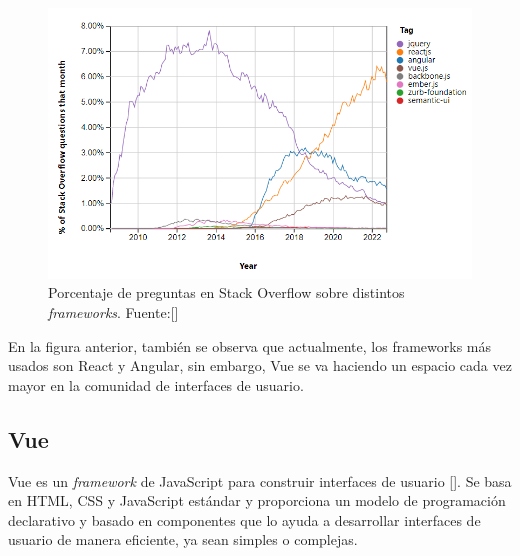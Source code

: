 \begin{figure}[htp]
\centering
\includegraphics[scale=0.9]{Graphics/stackoverflow}
\caption{Porcentaje de preguntas en Stack Overflow sobre distintos \textit{frameworks}. Fuente:[\cite{50}]}
\label{fig:stackoverflow}
\end{figure}

En la figura anterior, también se observa que actualmente, los frameworks más usados son React y Angular, sin embargo, Vue se va haciendo un espacio cada vez mayor en la comunidad de interfaces de usuario.


\subsection{Vue}
Vue es un \textit{framework} de JavaScript para construir interfaces de usuario [\cite{47}]. Se basa en HTML, CSS y JavaScript estándar y proporciona un modelo de programación declarativo y basado en componentes que lo ayuda a desarrollar interfaces de usuario de manera eficiente, ya sean simples o complejas.

